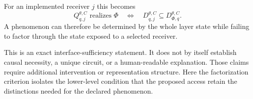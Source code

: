 For an implemented receiver $j$ this becomes
\begin{equation}
Q_{q,j}^{\theta,C}\text{ realizes }\Phi
\quad\Longleftrightarrow\quad
D_{q,j}^{\theta,C}
\subseteq
D_{\Phi,q}^{\theta,C}.
\label{eq:receiver-realization}
\end{equation}
A phenomenon can therefore be determined by the whole layer state while failing to factor through the state exposed to a selected receiver.

This is an exact interface-sufficiency statement. It does not by itself establish causal necessity, a unique circuit, or a human-readable explanation. Those claims require additional intervention or representation structure. Here the factorization criterion isolates the lower-level condition that the proposed access retain the distinctions needed for the declared phenomenon.
